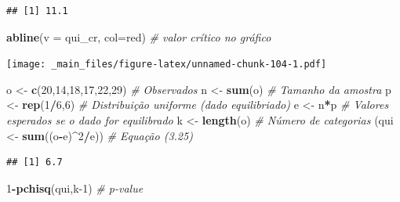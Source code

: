 \documentclass[
]{book}
\newenvironment{Shaded}{\begin{snugshade}}{\end{snugshade}}
\newcommand{\CommentTok}[1]{\textcolor[rgb]{0.56,0.35,0.01}{\textit{#1}}}
\newcommand{\DataTypeTok}[1]{\textcolor[rgb]{0.13,0.29,0.53}{#1}}
\newcommand{\DecValTok}[1]{\textcolor[rgb]{0.00,0.00,0.81}{#1}}
\newcommand{\KeywordTok}[1]{\textcolor[rgb]{0.13,0.29,0.53}{\textbf{#1}}}
\newcommand{\NormalTok}[1]{#1}
\newcommand{\OperatorTok}[1]{\textcolor[rgb]{0.81,0.36,0.00}{\textbf{#1}}}
\newcommand{\StringTok}[1]{\textcolor[rgb]{0.31,0.60,0.02}{#1}}
\theoremstyle{definition}
\theoremstyle{definition}
\theoremstyle{definition}
\theoremstyle{remark}
\begin{document}
\begin{verbatim}
## [1] 11.1
\end{verbatim}

\begin{Shaded}
\begin{Highlighting}[]
\KeywordTok{abline}\NormalTok{(}\DataTypeTok{v =}\NormalTok{ qui\_cr, }\DataTypeTok{col=}\StringTok{\textquotesingle{}red\textquotesingle{}}\NormalTok{) }\CommentTok{\# valor crítico no gráfico}
\end{Highlighting}
\end{Shaded}

\texttt{[image: \_main\_files/figure-latex/unnamed-chunk-104-1.pdf]}

\begin{Shaded}
\begin{Highlighting}[]
\NormalTok{o \textless{}{-}}\StringTok{ }\KeywordTok{c}\NormalTok{(}\DecValTok{20}\NormalTok{,}\DecValTok{14}\NormalTok{,}\DecValTok{18}\NormalTok{,}\DecValTok{17}\NormalTok{,}\DecValTok{22}\NormalTok{,}\DecValTok{29}\NormalTok{)     }\CommentTok{\# Observados}
\NormalTok{n \textless{}{-}}\StringTok{ }\KeywordTok{sum}\NormalTok{(o)                   }\CommentTok{\# Tamanho da amostra}
\NormalTok{p \textless{}{-}}\StringTok{ }\KeywordTok{rep}\NormalTok{(}\DecValTok{1}\OperatorTok{/}\DecValTok{6}\NormalTok{,}\DecValTok{6}\NormalTok{)               }\CommentTok{\# Distribuição uniforme (dado equilibriado)}
\NormalTok{e \textless{}{-}}\StringTok{ }\NormalTok{n}\OperatorTok{*}\NormalTok{p                      }\CommentTok{\# Valores esperados se o dado for equilibrado}
\NormalTok{k \textless{}{-}}\StringTok{ }\KeywordTok{length}\NormalTok{(o)                }\CommentTok{\# Número de categorias}
\NormalTok{(qui \textless{}{-}}\StringTok{ }\KeywordTok{sum}\NormalTok{((o}\OperatorTok{{-}}\NormalTok{e)}\OperatorTok{\^{}}\DecValTok{2}\OperatorTok{/}\NormalTok{e))       }\CommentTok{\# Equação (3.25)}
\end{Highlighting}
\end{Shaded}

\begin{verbatim}
## [1] 6.7
\end{verbatim}

\begin{Shaded}
\begin{Highlighting}[]
\DecValTok{1}\OperatorTok{{-}}\KeywordTok{pchisq}\NormalTok{(qui,k}\DecValTok{{-}1}\NormalTok{)             }\CommentTok{\# p{-}value}
\end{Highlighting}
\end{Shaded}
\end{document}
